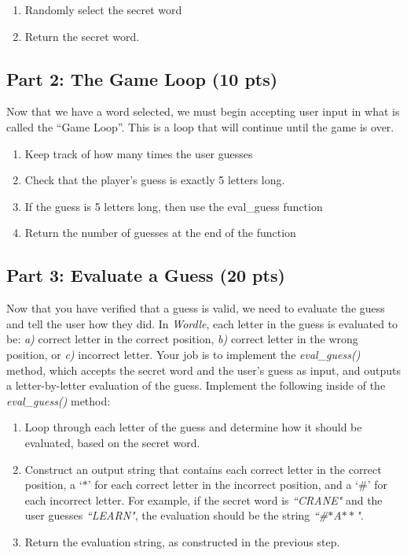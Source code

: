 \documentclass{article}
\begin{document}
\begin{enumerate}
\itemsep0em 
\item{Randomly select the secret word}
\item{Return the secret word.}
\end{enumerate}

\subsection{Part 2: The Game Loop (10 pts)}
\hspace{\parindent}Now that we have a word selected, we must begin accepting user input in what is called the ``Game Loop''. This is a loop that will continue until the game is over.

\begin{enumerate}
\itemsep0em 
\item{Keep track of how many times the user guesses}
\item{Check that the player's guess is exactly 5 letters long.}
\item If the guess is 5 letters long, then use the eval\_guess function
\item Return the number of guesses at the end of the function 
\end{enumerate}

\subsection{Part 3: Evaluate a Guess (20 pts)}
\hspace{\parindent}Now that you have verified that a guess is valid, we need to evaluate the guess and tell the user how they did. In \emph{Wordle}, each letter in the guess is evaluated to be: \emph{a)} correct letter in the correct position, \emph{b)} correct letter in the wrong position, or \emph{c)} incorrect letter. Your job is to implement the \emph{eval\_guess()} method, which accepts the secret word and the user's guess as input, and outputs a letter-by-letter evaluation of the guess. Implement the following inside of the \emph{eval\_guess()} method:

\begin{enumerate}
\itemsep0em 
\item{Loop through each letter of the guess and determine how it should be evaluated, based on the secret word.}
\item{Construct an output string that contains each correct letter in the correct position, a `$\ast$' for each correct letter in the incorrect position, and a `\#' for each incorrect letter. For example, if the secret word is \emph{``CRANE"} and the user guesses \emph{``LEARN"}, the evaluation should be the string \emph{``\#$\ast$A$\ast \ast$"}.}
\item{Return the evaluation string, as constructed in the previous step.}
\end{enumerate}
\end{document}

